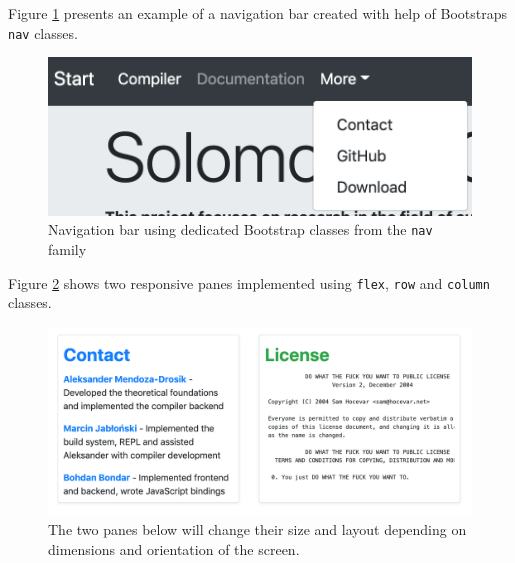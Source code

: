 Figure \ref{navbar}  presents an example of a navigation bar created with help of Bootstraps \texttt{nav} classes.
\begin{figure}
\centering

\includegraphics[scale=0.7]{navbar.png}
\caption{Navigation bar using dedicated Bootstrap classes from the \texttt{nav} family}
\label{navbar}
\end{figure}
Figure \ref{panes} shows two responsive panes implemented using \texttt{flex}, \texttt{row} and \texttt{column} classes.
\begin{figure}
\centering

\includegraphics[scale=0.4]{panes.png}
\caption{The two panes below will change their size and layout depending on dimensions and orientation of the screen.}
\label{panes}
\end{figure}

